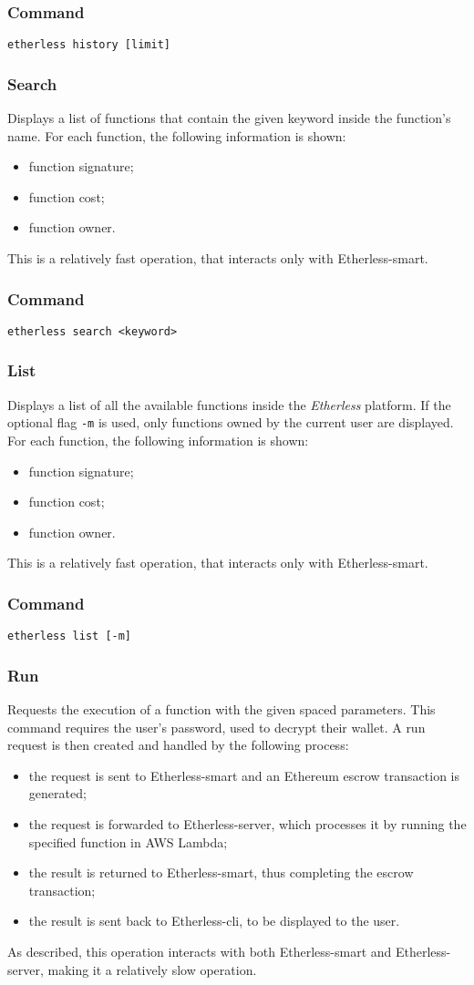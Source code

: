 	\subsubsection*{Command}
	\texttt{etherless history [limit]}
	\subsubsection{Search}
	Displays a list of functions that contain the given keyword inside the function's name. For each function, the following information is shown:
	\begin{itemize}
		\item function signature;
		\item function cost;
		\item function owner.
	\end{itemize}
	This is a relatively fast operation, that interacts only with Etherless-smart.
	\subsubsection*{Command}
	\texttt{etherless search <keyword>}
	\subsubsection{List}
	Displays a list of all the available functions inside the \textit{Etherless} platform. If the optional flag \texttt{-m} is used, only functions owned by the current user are displayed. For each function, the following information is shown:
	\begin{itemize}
		\item function signature;
		\item function cost;
		\item function owner.
	\end{itemize}This is a relatively fast operation, that interacts only with Etherless-smart.
	\subsubsection*{Command}
	\texttt{etherless list [-m]}
	\subsubsection{Run}
	Requests the execution of a function with the given spaced parameters. This command requires the user's password, used to decrypt their wallet. A run request is then created and handled by the following process:
	\begin{itemize}
		\item the request is sent to Etherless-smart and an Ethereum escrow transaction is generated;
		\item the request is forwarded to Etherless-server, which processes it by running the specified function in AWS Lambda;
		\item the result is returned to Etherless-smart, thus completing the escrow transaction;
		\item the result is sent back to Etherless-cli, to be displayed to the user.
	\end{itemize}
	As described, this operation interacts with both Etherless-smart and Etherless-server, making it a relatively slow operation.
